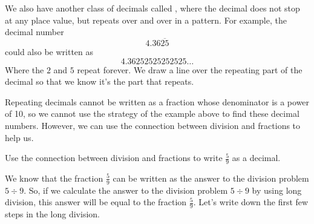 \documentclass{ximera}
\begin{document}
We also have another class of decimals called , where the decimal does not stop at any place value, but repeats over and over in a pattern. For example, the decimal number
\[
4.36\overline{25}
\]
could also be written as
\[
4.36252525252525\dots
\]
Where the $2$ and $5$ repeat forever. We draw a line over the repeating part of the decimal so that we know it's the part that repeats.

Repeating decimals cannot be written as a fraction whose denominator is a power of 10, so we cannot use the strategy of the example above to find these decimal numbers. However, we can use the connection between division and fractions to help us.

\begin{example}
Use the connection between division and fractions to write $\frac{5}{9}$ as a decimal. 

We know that the fraction $\frac{5}{9}$ can be written as the answer to the division problem $5 \div 9$. So, if we calculate the answer to the division problem $5 \div 9$ by using long division, this answer will be equal to the fraction $\frac{5}{9}$. Let's write down the first few steps in the long division.

\begin{image}
\end{image}
\end{example}
\end{document}
